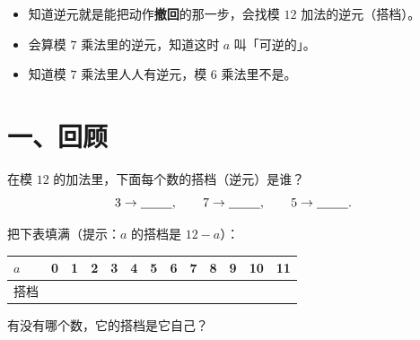 

\begin{mubiao}
  \begin{itemize}
    \item 知道逆元就是能把动作\textbf{撤回}的那一步，会找模 \(12\) 加法的逆元（搭档）。
    \item 会算模 \(7\) 乘法里的逆元，知道这时 \(a\) 叫「可逆的」。
    \item 知道模 \(7\) 乘法里人人有逆元，模 \(6\) 乘法里不是。
  \end{itemize}
\end{mubiao}

\section*{一、回顾}

\begin{sikao}
  在模 \(12\) 的加法里，下面每个数的搭档（逆元）是谁？
  \[
    3 \to \underline{\hspace{2.5em}}, \qquad
    7 \to \underline{\hspace{2.5em}}, \qquad
    5 \to \underline{\hspace{2.5em}} .
  \]
\end{sikao}

\begin{dongshou}[把模 12 加法的搭档找齐]
  把下表填满（提示：\(a\) 的搭档是 \(12-a\)）：
  \begin{center}
  {\small
  \begin{tabular}{@{}l*{12}{c}@{}}
    \toprule
    \(a\) & 0 & 1 & 2 & 3 & 4 & 5 & 6 & 7 & 8 & 9 & 10 & 11 \\
    \midrule
    搭档 & \hspace{1.1em} & \hspace{1.1em} & \hspace{1.1em} & \hspace{1.1em} & \hspace{1.1em} & \hspace{1.1em} & \hspace{1.1em} & \hspace{1.1em} & \hspace{1.1em} & \hspace{1.1em} & \hspace{1.1em} & \hspace{1.1em} \\
    \bottomrule
  \end{tabular}}
  \end{center}
  有没有哪个数，它的搭档是它自己？\underline{\hspace{3em}}
\end{dongshou}

